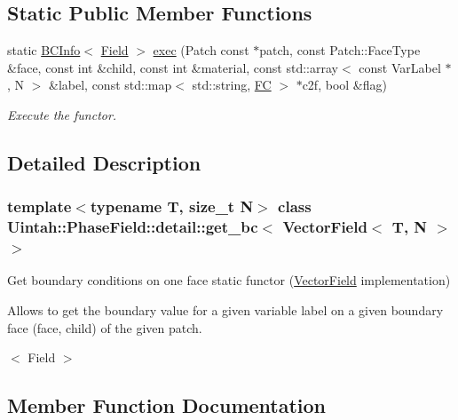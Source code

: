 \subsection*{Static Public Member Functions}
\begin{DoxyCompactItemize}
\item 
static \hyperlink{structUintah_1_1PhaseField_1_1BCInfo}{B\+C\+Info}$<$ \hyperlink{structUintah_1_1PhaseField_1_1VectorField}{Field} $>$ \hyperlink{classUintah_1_1PhaseField_1_1detail_1_1get__bc_3_01VectorField_3_01T_00_01N_01_4_01_4_a2731912cbb2b0b659ced15a94e705922}{exec} (Patch const $\ast$patch, const Patch\+::\+Face\+Type \&face, const int \&child, const int \&material, const std\+::array$<$ const Var\+Label $\ast$, N $>$ \&label, const std\+::map$<$ std\+::string, \hyperlink{namespaceUintah_1_1PhaseField_aeb51fe956fe07f1487f5878f4039f27c}{FC} $>$ $\ast$c2f, bool \&flag)
\begin{DoxyCompactList}\small\item\em Execute the functor. \end{DoxyCompactList}\end{DoxyCompactItemize}


\subsection{Detailed Description}
\subsubsection*{template$<$typename T, size\+\_\+t N$>$\newline
class Uintah\+::\+Phase\+Field\+::detail\+::get\+\_\+bc$<$ Vector\+Field$<$ T, N $>$ $>$}

Get boundary conditions on one face static functor (\hyperlink{structUintah_1_1PhaseField_1_1VectorField}{Vector\+Field} implementation) 

Allows to get the boundary value for a given variable label on a given boundary face (face, child) of the given patch.

$<$ Field $>$ 

\subsection{Member Function Documentation}
\mbox{\label{classUintah_1_1PhaseField_1_1detail_1_1get__bc_3_01VectorField_3_01T_00_01N_01_4_01_4_a2731912cbb2b0b659ced15a94e705922}} 
